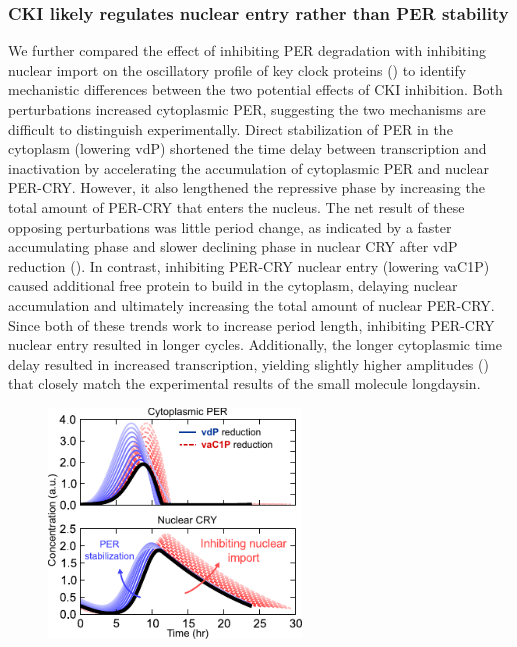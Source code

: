 \subsubsection{CKI likely regulates nuclear entry rather than PER stability}
We further compared the effect of inhibiting PER degradation with inhibiting nuclear import on the oscillatory profile of key clock proteins () to identify mechanistic differences between the two potential effects of CKI inhibition. 
Both perturbations increased cytoplasmic PER, suggesting the two mechanisms are difficult to distinguish experimentally. 
Direct stabilization of PER in the cytoplasm (lowering vdP) shortened the time delay between transcription and inactivation by accelerating the accumulation of cytoplasmic PER and nuclear PER-CRY. 
However, it also lengthened the repressive phase by increasing the total amount of PER-CRY that enters the nucleus. 
The net result of these opposing perturbations was little period change, as indicated by a faster accumulating phase and slower declining phase in nuclear CRY after vdP reduction (). 
In contrast, inhibiting PER-CRY nuclear entry (lowering vaC1P) caused additional free protein to build in the cytoplasm, delaying nuclear accumulation and ultimately increasing the total amount of nuclear PER-CRY. 
Since both of these trends work to increase period length, inhibiting PER-CRY nuclear entry resulted in longer cycles. 
Additionally, the longer cytoplasmic time delay resulted in increased transcription, yielding slightly higher amplitudes () that closely match the experimental results of the small molecule longdaysin. 

\begin{figure}[h]
  \centering
  \includegraphics[width=0.6\textwidth]{chap4/figures/fig4c.pdf}
  \label{fig:44c}
\end{figure}


